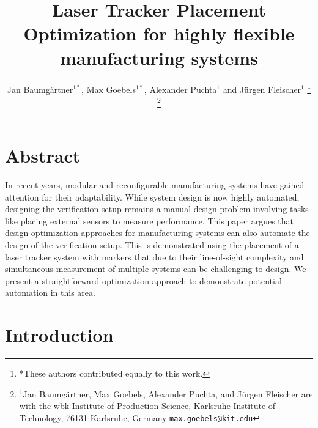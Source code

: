\documentclass{svproc}
\title{\LARGE \bf
Laser Tracker Placement Optimization for highly flexible manufacturing systems
}
\author{Jan Baumgärtner$^{1*}$, Max Goebels$^{1*}$,   Alexander Puchta$^{1}$ and Jürgen Fleischer$^{1}$%
\thanks{*These authors contributed equally to this work.}%
\thanks{$^{1}$Jan Baumgärtner, Max Goebels, Alexander Puchta, and Jürgen Fleischer are with the wbk Institute of Production Science,
        Karlsruhe Institute of Technology, 76131 Karlsruhe, Germany
        {\tt\small max.goebels@kit.edu}}%
}
\begin{document}
\maketitle
\thispagestyle{empty}
\pagestyle{empty}

\section*{Abstract}
In recent years, modular and reconfigurable manufacturing systems have gained attention for their adaptability. 
While system design is now highly automated, designing the verification setup remains a manual design problem involving tasks like placing external sensors to measure performance. 
This paper argues that design optimization approaches for manufacturing systems can also automate the design of the verification setup.
This is demonstrated using the placement of a laser tracker system with markers that due to their line-of-sight complexity and simultaneous measurement of multiple systems can be challenging to design.
We present a straightforward optimization approach to demonstrate potential automation in this area.
\section{Introduction}
\end{document}
